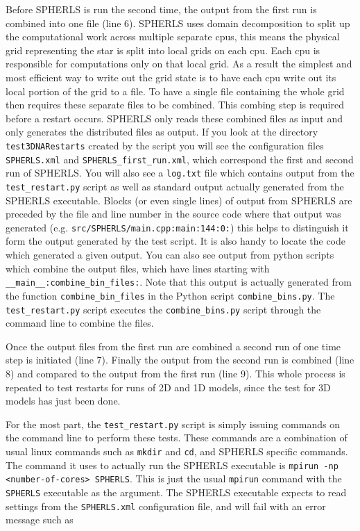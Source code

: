 \documentclass[12pt,a4paper]{book}
\begin{document}
Before SPHERLS is run the second time, the output from the first run is combined into one file (line 6). SPHERLS uses domain decomposition to split up the computational work across multiple separate cpus, this means the physical grid representing the star is split into local grids on each cpu. Each cpu is responsible for computations only on that local grid. As a result the simplest and most efficient way to write out the grid state is to have each cpu write out its local portion of the grid to a file. To have a single file containing the whole grid then requires these separate files to be combined. This combing step is required before a restart occurs. SPHERLS only reads these combined files as input and only generates the distributed files as output. If you look at the directory {\tt test3DNARestarts} created by the script you will see the configuration files {\tt SPHERLS.xml} and {\tt SPHERLS\_first\_run.xml}, which correspond the first and second run of SPHERLS. You will also see a {\tt log.txt} file which contains output from the {\tt test\_restart.py} script as well as standard output actually generated from the SPHERLS executable. Blocks (or even single lines) of output from SPHERLS are preceded by the file and line number in the source code where that output was generated (e.g. {\tt src/SPHERLS/main.cpp:main:144:0:}) this helps to distinguish it form the output generated by the test script. It is also handy to locate the code which generated a given output. You can also see output from python scripts which combine the output files, which have lines starting with {\tt \_\_main\_\_:combine\_bin\_files:}. Note that this output is actually generated from the function {\tt combine\_bin\_files} in the Python script {\tt combine\_bins.py}. The {\tt test\_restart.py} script executes the {\tt combine\_bins.py} script through the command line to combine the files. 

Once the output files from the first run are combined a second run of one time step is initiated (line 7). Finally the output from the second run is combined (line 8) and compared to the output from the first run (line 9). This whole process is repeated to test restarts for runs of 2D and 1D models, since the test for 3D models has just been done.

For the most part, the {\tt test\_restart.py} script is simply issuing commands on the command line to perform these tests. These commands are a combination of usual linux commands such as {\tt mkdir} and {\tt cd}, and SPHERLS specific commands. The command it uses to actually run the SPHERLS executable is {\tt mpirun -np <number-of-cores> SPHERLS}. This is just the usual {\tt mpirun} command with the {\tt SPHERLS} executable as the argument. The SPHERLS executable expects to read settings from the {\tt SPHERLS.xml} configuration file, and will fail with an error message such as 
\end{document}
